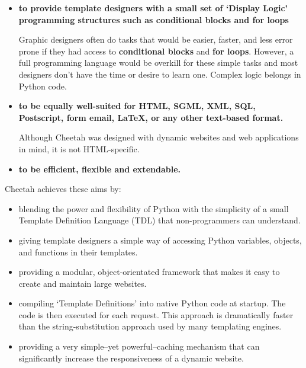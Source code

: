 \begin{itemize}
     
\item {\bf to provide template designers with a small set of `Display Logic'
       programming structures such as conditional blocks and for loops}
     
     Graphic designers often do tasks that would be easier, faster, and less
     error prone if they had access to {\bf conditional blocks} and {\bf for
       loops}.  However, a full programming language would be overkill for these
     simple tasks and most designers don't have the time or desire to learn
     one. Complex logic belongs in Python code.
     
\item {\bf to be equally well-suited for HTML, SGML, XML, SQL, Postscript, form
       email, LaTeX, or any other text-based format.}
     
     Although Cheetah was designed with dynamic websites and web applications
     in mind, it is not HTML-specific.
     
\item {\bf to be efficient, flexible and extendable.}
     
\end{itemize}

Cheetah achieves these aims by:

\begin{itemize}     
     
\item blending the power and flexibility of Python with the simplicity of a
     small Template Definition Language (TDL) that non-programmers can
     understand.
     
\item giving template designers a simple way of accessing Python variables,
     objects, and functions in their templates.
     
\item providing a modular, object-orientated framework that makes it easy to
     create and maintain large websites.
     
\item compiling `Template Definitions' into native Python code at startup.
     The code is then executed for each request.  This approach is
     dramatically faster than the string-substitution approach used by many
     templating engines.

\item providing a very simple--yet powerful--caching mechanism that can
     significantly increase the responsiveness of a dynamic website.

\end{itemize}

